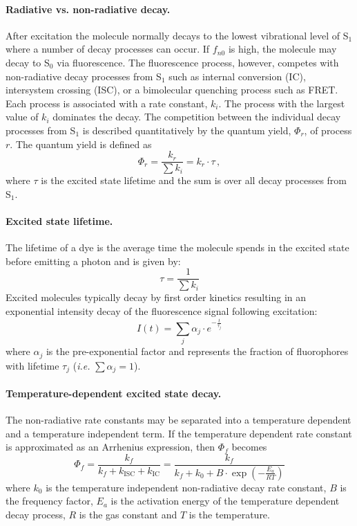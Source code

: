  \paragraph{Radiative vs. non-radiative decay.} After excitation the molecule normally decays to the lowest vibrational level of S$_1$ where a number of decay processes can occur. If $f_{n0}$ is high, the molecule may decay to S$_0$ via fluorescence. The fluorescence process, however, competes with non-radiative decay processes from S$_1$ such as internal conversion (IC), intersystem crossing (ISC), or a bimolecular quenching process such as FRET. Each process is associated with a rate constant, $k_i$. The process with the largest value of $k_i$ dominates the decay. The competition between the individual decay processes from S$_1$ is described quantitatively by the quantum yield, $\Phi_r$, of process $r$. The quantum yield is defined as
\begin{equation}
 \Phi_r = \frac{k_r}{\sum k_i} = k_r \cdot \tau\, ,
\end{equation}
 where $\tau$ is the excited state lifetime and the sum is over all decay processes from S$_1$.

 \paragraph{Excited state lifetime.} The lifetime of a dye is the average time the molecule spends in the excited state before emitting a photon and is given by:
\begin{equation}
 \tau = \frac{1}{\sum k_i}
 \label{eq:lifetime}
\end{equation}
 Excited molecules typically decay by first order kinetics resulting in an exponential intensity decay of the fluorescence signal following excitation:
\begin{equation}
 I(t) = \sum_j \alpha_j \cdot e^{-\frac{t}{\tau_j}}
 \label{eqn:MultiExponentialHenfald}
\end{equation}
 where $\alpha_j$ is the pre-exponential factor and represents the fraction of fluorophores with lifetime $\tau_j$ (\emph{i.e.} $\sum\alpha_j = 1$).

 \paragraph{Temperature-dependent excited state decay.} The non-radiative rate constants may be separated into a temperature dependent and a temperature independent term. If the temperature dependent rate constant is approximated as an Arrhenius expression, then $\Phi_f$ becomes
\begin{equation}
 \Phi_f = \frac{k_f}{k_f + k_\mathrm{ISC} + k_\mathrm{IC}} = \frac{k_f}{k_f + k_0 + B\cdot\exp(-\frac{E_a}{RT})}
 \label{eq:FluorescenceQuantumYield}
\end{equation}
 where $k_0$ is the temperature independent non-radiative decay rate constant, $B$ is the frequency factor, $E_a$ is the activation energy of the temperature dependent decay process, $R$ is the gas constant and $T$ is the temperature.

